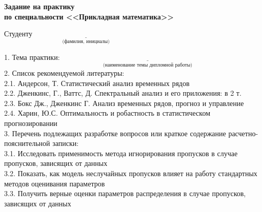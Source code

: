 \vspace{0.4cm}
\begin{center}
    \textbf{Задание на практику}\\[0.3cm]
    \textbf{по специальности <<Прикладная математика>>}
\end{center}
\begin{flushleft}
    {Студенту $\underset{\text{(фамилия, инициалы)}}{\underline{\hspace{6cm}}}$

    \vspace{0.6cm}
    1. Тема практики: $\underset{\text{(наименование темы дипломной работы)}}{\underline{\hspace{10cm}}}$\\

    \vspace{0.6cm}
    2. Список рекомендуемой литературы:\\
    \hspace*{0.8cm}2.1. Андерсон, Т. Статистический анализ временных рядов\\
    \hspace*{0.8cm}2.2. Дженкинс, Г., Ваттс, Д. Спектральный анализ и его приложения: в 2 т.\\
    \hspace*{0.8cm}2.3. Бокс Дж., Дженкинс Г. Анализ временных рядов, прогноз и управление\\
    \hspace*{0.8cm}2.4. Харин, Ю.С. Оптимальность и робастность в статистическом
    прогнозировании\\[0.3cm]

    3. Перечень подлежащих разработке вопросов или краткое содержание расчетно-пояснительной записки:\\[0.2cm]
    \hspace*{0.8cm}3.1. Исследовать применимость метода игнорирования пропусков в случае
    пропусков, зависящих от данных\\[0.2cm]
    \hspace*{0.8cm}3.2. Показать, как модель неслучайных пропусков влияет на работу стандартных
    методов оценивания параметров\\[0.2cm]
    \hspace*{0.8cm}3.3. Получить верные оценки параметров распределения в случае пропусков, 
    зависящих от данных\\[0.3cm]

}
\end{flushleft}
